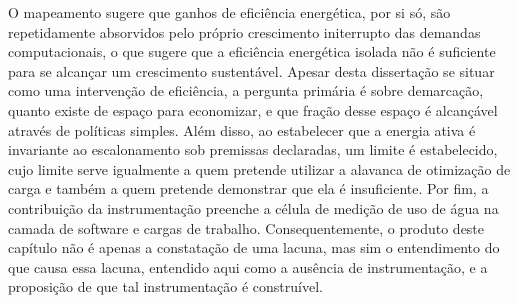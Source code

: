 O mapeamento sugere que ganhos de eficiência energética, por si só, são repetidamente absorvidos pelo próprio
crescimento initerrupto das demandas computacionais, o que sugere que a eficiência energética isolada não é suficiente
para se alcançar um crescimento sustentável. Apesar desta dissertação se situar como uma intervenção de eficiência,
a pergunta primária é sobre demarcação, quanto existe de espaço para economizar, e que fração desse espaço
é alcançável através de políticas simples. Além disso, ao estabelecer que a energia ativa é invariante ao escalonamento
sob premissas declaradas, um limite é estabelecido, cujo limite serve igualmente a quem pretende utilizar a
alavanca de otimização de carga e também a quem pretende demonstrar que ela é insuficiente. Por fim, a contribuição
da instrumentação preenche a célula de medição de uso de água na camada de software e cargas de trabalho.
Consequentemente, o produto deste capítulo não é apenas a constatação de uma lacuna, mas sim o entendimento do que
causa essa lacuna, entendido aqui como a ausência de instrumentação, e a proposição de que tal instrumentação é construível.